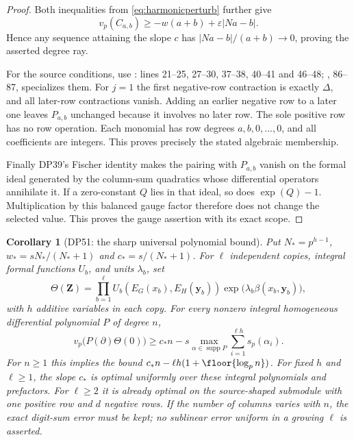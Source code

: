 \documentclass[11pt,a4paper]{article}
\newtheorem{corollary}[theorem]{Corollary}
\theoremstyle{definition}\newtheorem{remark}[theorem]{Remark}
\newcommand{\vp}{v_p}\newcommand{\dR}{\mathrm{dR}}\newcommand{\crys}{\mathrm{crys}}
\begin{document}
\begin{proof}
Both inequalities from \eqref{eq:harmonicperturb} further give
\[
 \vp(C_{a,b})\ge-w(a+b)+\varepsilon|Na-b|.
\]
Hence any sequence attaining the slope $c$ has
$|Na-b|/(a+b)\to0$, proving the asserted degree ray.

For the source conditions, use :  lines 21--25,
 27--30,  37--38,  40--41 and
 46--48; ,  86--87, specializes them.
For $j=1$ the first negative-row contraction is exactly $\Delta$, and all later-row contractions vanish.
Adding an earlier negative row to a later one leaves $P_{a,b}$ unchanged because it involves no later row.
The sole positive row has no row operation.
Each monomial has row degrees $a,b,0,\ldots,0$, and all coefficients are integers.
This proves precisely the stated algebraic  membership.

Finally DP39's Fischer identity makes the pairing with $P_{a,b}$ vanish on the formal ideal generated by the column-sum quadratics whose differential operators annihilate it.
If a zero-constant $Q$ lies in that ideal, so does $\exp(Q)-1$.
Multiplication by this balanced gauge factor therefore does not change the selected value.
This proves the gauge assertion with its exact scope.
\end{proof}

\begin{corollary}[DP51: the sharp universal polynomial bound]
Put $N_*=p^{h-1}$, $w_*=sN_* /(N_*+1)$ and $c_*=s/(N_*+1)$.
For $\ell$ independent copies, integral formal functions $U_b$, and units $\lambda_b$, set
\[
 \Theta(\mathbf Z)=\prod_{b=1}^{\ell}
 U_b(E_G(x_b),E_H(\mathbf y_b))
 \exp\bigl(\lambda_b\beta(x_b,\mathbf y_b)\bigr),
\]
with $h$ additive variables in each copy.
For every nonzero integral homogeneous differential polynomial $P$ of degree $n$,
\begin{equation}\label{eq:harmonicuniversal}
 \vp\bigl(P(\partial)\Theta(0)\bigr)
 \ge c_*n-s\max_{\alpha\in\operatorname{supp}P}
                  \sum_{i=1}^{\ell h}s_p(\alpha_i).
\end{equation}
For $n\ge1$ this implies the bound
$c_*n-\ell h(1+\floor{\log_p n})$.
For fixed $h$ and $\ell\ge1$, the slope $c_*$ is optimal uniformly over these integral polynomials and prefactors.
For $\ell\ge2$ it is already optimal on the source-shaped  submodule with one positive row and $d$ negative rows.
If the number of columns varies with $n$, the exact digit-sum error must be kept; no sublinear error uniform in a growing $\ell$ is asserted.
\end{corollary}
\end{document}
